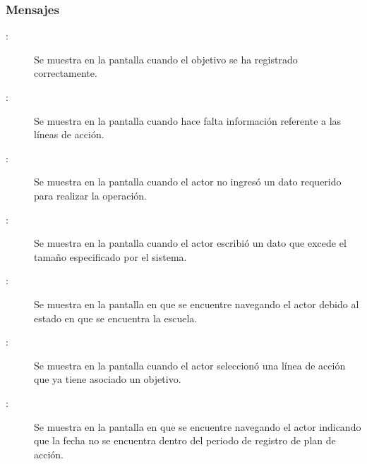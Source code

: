 \subsubsection{Mensajes}

\begin{description}
	\item[:] Se muestra en la pantalla  cuando el objetivo se ha registrado correctamente.
	\item[:] Se muestra en la pantalla  cuando hace falta información referente a las líneas de acción.
	\item[:] Se muestra en la pantalla  cuando el actor no ingresó un dato requerido para realizar la operación.
	\item[:] Se muestra en la pantalla  cuando el actor escribió un dato que excede el tamaño especificado por el sistema.
	\item[:] Se muestra en la pantalla en que se encuentre navegando el actor debido al estado en que se encuentra la escuela.	
	\item[:] Se muestra en la pantalla  cuando el actor seleccionó una línea de acción que ya tiene asociado un objetivo.
	\item[\UCli {}:] Se muestra en la pantalla en que se encuentre navegando el actor indicando que la fecha no se encuentra dentro del periodo de registro de plan de acción.
\end{description}
